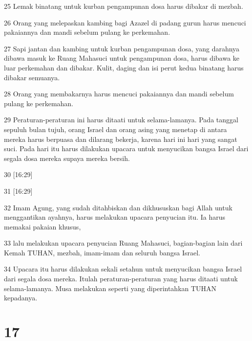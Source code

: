 \par 25 Lemak binatang untuk kurban pengampunan dosa harus dibakar di mezbah.
\par 26 Orang yang melepaskan kambing bagi Azazel di padang gurun harus mencuci pakaiannya dan mandi sebelum pulang ke perkemahan.
\par 27 Sapi jantan dan kambing untuk kurban pengampunan dosa, yang darahnya dibawa masuk ke Ruang Mahasuci untuk pengampunan dosa, harus dibawa ke luar perkemahan dan dibakar. Kulit, daging dan isi perut kedua binatang harus dibakar semuanya.
\par 28 Orang yang membakarnya harus mencuci pakaiannya dan mandi sebelum pulang ke perkemahan.
\par 29 Peraturan-peraturan ini harus ditaati untuk selama-lamanya. Pada tanggal sepuluh bulan tujuh, orang Israel dan orang asing yang menetap di antara mereka harus berpuasa dan dilarang bekerja, karena hari ini hari yang sangat suci. Pada hari itu harus dilakukan upacara untuk menyucikan bangsa Israel dari segala dosa mereka supaya mereka bersih.
\par 30 [16:29]
\par 31 [16:29]
\par 32 Imam Agung, yang sudah ditahbiskan dan dikhususkan bagi Allah untuk menggantikan ayahnya, harus melakukan upacara penyucian itu. Ia harus memakai pakaian khusus,
\par 33 lalu melakukan upacara penyucian Ruang Mahasuci, bagian-bagian lain dari Kemah TUHAN, mezbah, imam-imam dan seluruh bangsa Israel.
\par 34 Upacara itu harus dilakukan sekali setahun untuk menyucikan bangsa Israel dari segala dosa mereka. Itulah peraturan-peraturan yang harus ditaati untuk selama-lamanya. Musa melakukan seperti yang diperintahkan TUHAN kepadanya.

\chapter{17}

